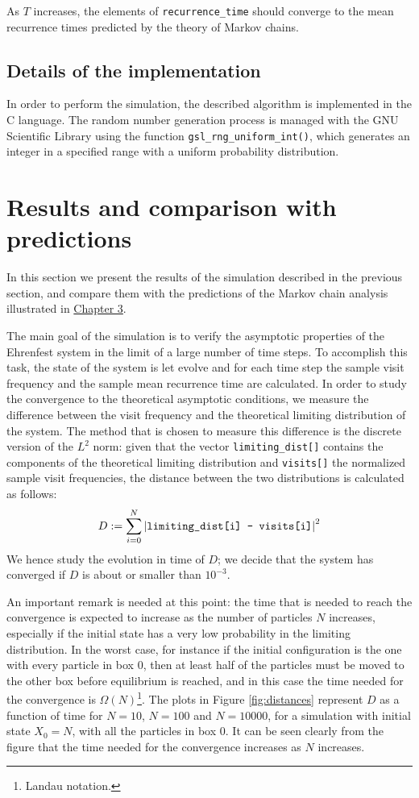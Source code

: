 As $T$ increases, the elements of \texttt{recurrence\_time} should converge to the mean recurrence times predicted by the theory of Markov chains.

\subsection{Details of the implementation}
In order to perform the simulation, the described algorithm is implemented in the C language. The random number generation process is managed with the GNU Scientific Library using the function \texttt{gsl\_rng\_uniform\_int()}, which generates an integer in a specified range with a uniform probability distribution.


\section{Results and comparison with predictions}
In this section we present the results of the simulation described in the previous section, and compare them with the predictions of the Markov chain analysis illustrated in \hyperref[ch:3]{Chapter 3}.

The main goal of the simulation is to verify the asymptotic properties of the Ehrenfest system in the limit of a large number of time steps. To accomplish this task, the state of the system is let evolve and for each time step the sample visit frequency and the sample mean recurrence time are calculated. In order to study the convergence to the theoretical asymptotic conditions, we measure the difference between the visit frequency and the theoretical limiting distribution of the system. The method that is chosen to measure this difference is the discrete version of the $L^2$ norm: given that the vector \texttt{limiting\_dist[]} contains the components of the theoretical limiting distribution and \texttt{visits[]} the normalized sample visit frequencies, the distance between the two distributions is calculated as follows:
\begin{equation} \label{eq:distance}
    D := \sum_{i = 0}^{N} \left|\text{\texttt{limiting\_dist[i] - visits[i]}} \right| ^2
\end{equation}
We hence study the evolution in time of $D$; we decide that the system has converged if $D$ is about or smaller than $10^{-3}$.

An important remark is needed at this point: the time that is needed to reach the convergence is expected to increase as the number of particles $N$ increases, especially if the initial state has a very low probability in the limiting distribution. In the worst case, for instance if the initial configuration is the one with every particle in box 0, then at least half of the particles must be moved to the other box before equilibrium is reached, and in this case the time needed for the convergence is $\Omega(N)$\footnote{Landau notation.}. The plots in Figure \ref{fig:distances} represent $D$ as a function of time for $N = 10$, $N = 100$ and $N = 10000$, for a simulation with initial state $X_0 = N$, \ie with all the particles in box 0. It can be seen clearly from the figure that the time needed for the convergence increases as $N$ increases.

